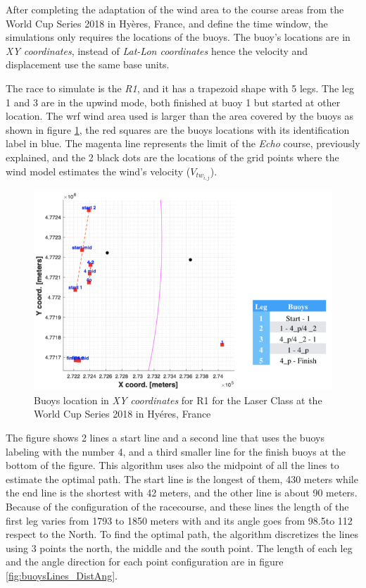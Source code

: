 After completing the adaptation of the wind area to the course areas from the World Cup Series 2018 in Hyères, France,  and define the time window, the simulations only requires the locations of the buoys. The buoy's locations are in \textit{XY coordinates}, instead of \textit{Lat-Lon coordinates} hence the velocity and displacement use the same base units. \par %
The race to simulate is the \textit{R1}, and it has a trapezoid shape with 5 legs. The leg 1 and 3 are in the upwind mode, both finished at buoy 1 but started at other location. The \acrshort{wrf} wind area used is larger than the area covered by the buoys as shown in figure \ref{fig:weather_xy_bouys}, the red squares are the buoys locations with its identification label in blue. The magenta line represents the limit of the \textit{Echo} course, previously explained, and the 2 black dots are the locations of the grid points where the wind model estimates the wind's velocity ($V_{tw_{i,j}}$). \par \noindent
\begin{figure} [hbt!]
    \centering
    \includegraphics [width=0.75 \linewidth] {images/buoys_leg.png} %
    \caption{Buoys location in \textit{XY coordinates} for R1 for the Laser Class at the World Cup Series 2018 in Hyéres, France}
    \label{fig:weather_xy_bouys}
\end{figure}

The figure shows 2 lines a start line and a second line that uses the buoys labeling with the number 4, and a third smaller line for the finish buoys at the bottom of the figure. This algorithm uses also the midpoint of all the lines to estimate the optimal path. The start line is the longest of them, 430 meters while the end line is the shortest with 42 meters, and the other line is about 90 meters. Because of the configuration of the racecourse, and these lines the length of the first leg varies from 1793 to 1850 meters with and its angle goes from 98.5\degree to 112 \degree respect to the North. To find the optimal path, the algorithm discretizes the lines using 3 points the north, the middle and the south point. The length of each leg and the angle direction for each point configuration are in figure \ref{fig:buoysLines_DistAng}. \par  

